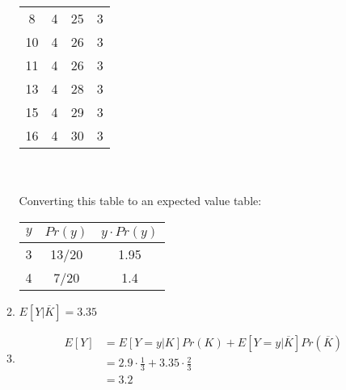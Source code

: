 \documentclass{article}
\begin{document}
\begin{enumerate}
\begin{enumerate}[label=\arabic*.]
\begin{multicols}{2}
\begin{tabular}{c|c||c|c}
                            8     & 4           & 25    & 3           \\
                            10    & 4           & 26    & 3           \\
                            11    & 4           & 26    & 3           \\
                            13    & 4           & 28    & 3           \\
                            15    & 4           & 29    & 3           \\
                            16    & 4           & 30    & 3           \\
                        \end{tabular}
                        \columnbreak \\
                        \\[3em]
                        Converting this table to an expected value table:
                        \begin{tabular}{c|c|c}
                            $y$ & $Pr(y)$ & $y \cdot Pr(y)$ \\
                            \hline
                            3   & 13/20   & 1.95            \\
                            4   & 7/20    & 1.4
                        \end{tabular}
                    \end{multicols}
              \item \(E[Y | \overline{K}] = 3.35\)
              \item \begin{align*}
                        E[Y] & = E[Y = y | K]Pr(K)      + E[Y = y | \overline{K}]Pr(\overline{K}) \\
                             & = 2.9 \cdot \frac{1}{3}  + 3.35 \cdot \frac{2}{3}                  \\
                             & = 3.2
                    \end{align*}
          \end{enumerate}

\end{enumerate}
\end{document}

